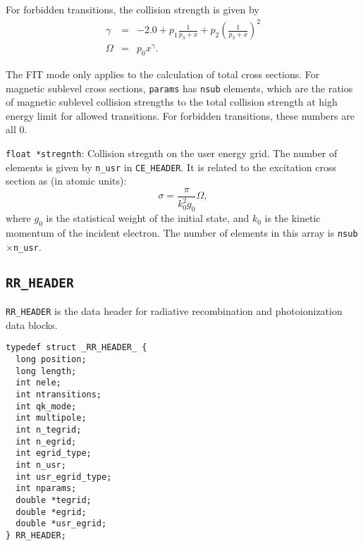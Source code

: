 \begin{dbdesc}
For forbidden transitions, the collision strength is given by
\begin{eqnarray}
\gamma &=& -2.0 + p_1\frac{1}{p_3+x} + 
p_2\left(\frac{1}{p_3+x}\right)^2\nonumber\\
\Omega &=& p_0x^\gamma.
\end{eqnarray}

The FIT mode only applies to the calculation of total cross sections. For
magnetic sublevel cross sections, \texttt{params} has \texttt{nsub} elements,
which are the ratios of magnetic sublevel collision strengths to the total
collision strength at high energy limit for allowed transitions. For forbidden
transitions, these numbers are all 0.

\item[\texttt{float *stregnth}:] Collision stregnth on the user energy
grid. The number of elements is given by \texttt{n\_usr} in
\texttt{CE\_HEADER}. It is related to the excitation cross section as (in
atomic units):
\begin{equation}
\sigma = \frac{\pi}{k_0^2g_0}\Omega,
\end{equation}
where $g_0$ is the statistical weight of the initial state, and $k_0$ is the
kinetic momentum of the incident electron. The number of elements in this
array is \texttt{nsub}$\times$\texttt{n\_usr}.
\end{dbdesc}

\subsection{\texttt{RR\_HEADER}}
\texttt{RR\_HEADER} is the data header for radiative recombination and
photoionization data blocks.

\begin{verbatim}
typedef struct _RR_HEADER_ {
  long position;
  long length;
  int nele;
  int ntransitions;
  int qk_mode;
  int multipole;
  int n_tegrid;
  int n_egrid;
  int egrid_type;
  int n_usr;
  int usr_egrid_type;
  int nparams;
  double *tegrid;
  double *egrid;
  double *usr_egrid;
} RR_HEADER;
\end{verbatim}

